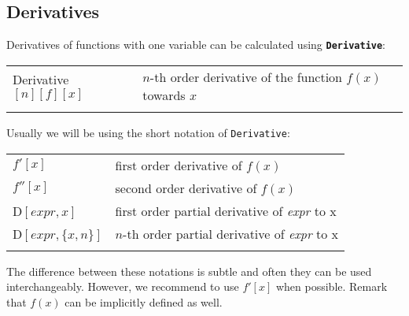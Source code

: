
\subsection{Derivatives}


Derivatives of functions with one variable can be calculated using \textbf{\lstinline|Derivative|}:\\

\begin{tabular}{>{\hfill}p{8cm}p{9cm}}
	Derivative$[n][f][x]$			&			$n$-th order derivative of the function $f(x)$ towards $x$\\
	\multicolumn{2}{l}{} 
\end{tabular}

Usually we will be using the short notation of \lstinline|Derivative|:\\

\begin{tabular}{>{\hfill}p{8cm}p{9cm}}
	$f'[x]$							&			first order derivative of $f(x)$\\
	$f''[x]$						&			second order derivative of $f(x)$\\
	D$[expr, x]$					&			first order partial derivative of \textit{expr} to x\\
	D$[expr,\{x,n\}]$				&			$n$-th order partial derivative of \textit{expr} to x\\
	\multicolumn{2}{l}{} 
\end{tabular}

The difference between these notations is subtle and often they can be used interchangeably. However, we recommend to use $f'[x]$ when possible.
Remark that $f(x)$ can be implicitly defined as well. 

